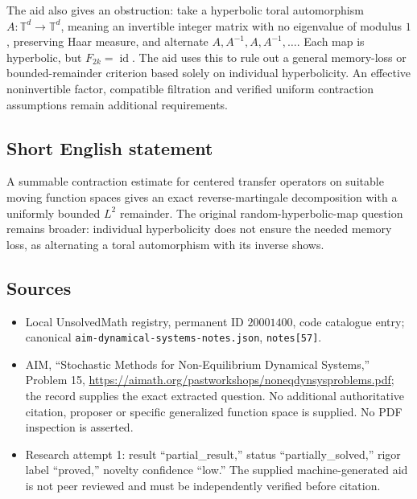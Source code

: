 \documentclass[11pt]{article}
\begin{document}
The aid also gives an obstruction: take a hyperbolic toral automorphism \(A:\mathbb T^d\to\mathbb T^d\), meaning an invertible integer matrix with no eigenvalue of modulus \(1\), preserving Haar measure, and alternate \(A,A^{-1},A,A^{-1},\ldots\). Each map is hyperbolic, but \(F_{2k}=\operatorname{id}\). The aid uses this to rule out a general memory-loss or bounded-remainder criterion based solely on individual hyperbolicity. An effective noninvertible factor, compatible filtration and verified uniform contraction assumptions remain additional requirements.
\subsection{Short English statement}
A summable contraction estimate for centered transfer operators on suitable moving function spaces gives an exact reverse-martingale decomposition with a uniformly bounded \(L^2\) remainder. The original random-hyperbolic-map question remains broader: individual hyperbolicity does not ensure the needed memory loss, as alternating a toral automorphism with its inverse shows.
\subsection{Sources}
\begin{itemize}
\item Local UnsolvedMath registry, permanent ID \(20001400\), code catalogue entry; canonical \texttt{aim-dynamical-systems-notes.json}, \texttt{notes[57]}.
\item AIM, ``Stochastic Methods for Non-Equilibrium Dynamical Systems,'' Problem 15, \url{https://aimath.org/pastworkshops/noneqdynsysproblems.pdf}; the record supplies the exact extracted question. No additional authoritative citation, proposer or specific generalized function space is supplied. No PDF inspection is asserted.
\item Research attempt 1: result ``partial\_result,'' status ``partially\_solved,'' rigor label ``proved,'' novelty confidence ``low.'' The supplied machine-generated aid is not peer reviewed and must be independently verified before citation.
\end{itemize}
\end{document}
